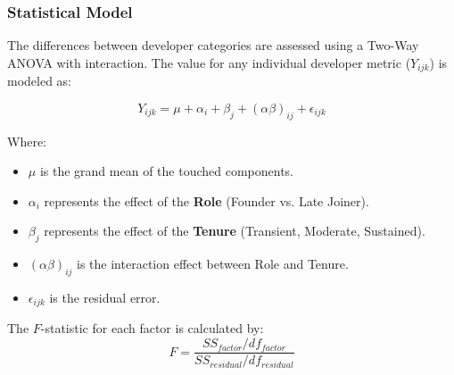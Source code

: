 

\subsubsection*{Statistical Model}
The differences between developer categories are assessed using a Two-Way ANOVA 
with interaction. The value for any individual developer metric ($Y_{ijk}$) 
is modeled as:

\begin{equation}
    Y_{ijk} = \mu + \alpha_i + \beta_j + (\alpha\beta)_{ij} + \epsilon_{ijk}
\end{equation}

Where:
\begin{itemize}
    \item $\mu$ is the grand mean of the touched components.
    \item $\alpha_i$ represents the effect of the \textbf{Role} (Founder vs. Late Joiner).
    \item $\beta_j$ represents the effect of the \textbf{Tenure} (Transient, Moderate, Sustained).
    \item $(\alpha\beta)_{ij}$ is the interaction effect between Role and Tenure.
    \item $\epsilon_{ijk}$ is the residual error.
\end{itemize}

The $F$-statistic for each factor is calculated by:
\begin{equation}
    F = \frac{SS_{factor} / df_{factor}}{SS_{residual} / df_{residual}}
\end{equation}

\newpage 
